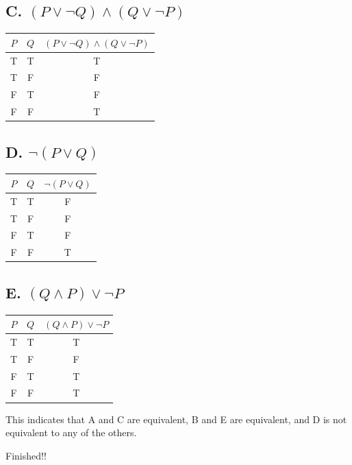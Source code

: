 \documentclass[12pt]{exam}
\begin{document}
\begin {enumerate} [listparindent=1.5em]
\begin {enumerate}
\subsection*{C. $(P \lor \neg Q) \land (Q \lor \neg P)$}
\begin{tabular}{cc|c}
\toprule
$P$ & $Q$ & $(P \lor \neg Q) \land (Q \lor \neg P)$ \\
\midrule
T & T & T \\
T & F & F \\
F & T & F \\
F & F & T \\
\bottomrule
\end{tabular}

\subsection*{D. $\neg(P \lor Q)$}
\begin{tabular}{cc|c}
\toprule
$P$ & $Q$ & $\neg(P \lor Q)$ \\
\midrule
T & T & F \\
T & F & F \\
F & T & F \\
F & F & T \\
\bottomrule
\end{tabular}

\subsection*{E. $(Q \land P) \lor \neg P$}
\begin{tabular}{cc|c}
\toprule
$P$ & $Q$ & $(Q \land P) \lor \neg P$ \\
\midrule
T & T & T \\
T & F & F \\
F & T & T \\
F & F & T \\
\bottomrule
\end{tabular}

This indicates that A and C are equivalent, B and E are equivalent, and D is not equivalent to any of the others. 

Finished!!
\end {enumerate}
\end {enumerate}
\end{document}
